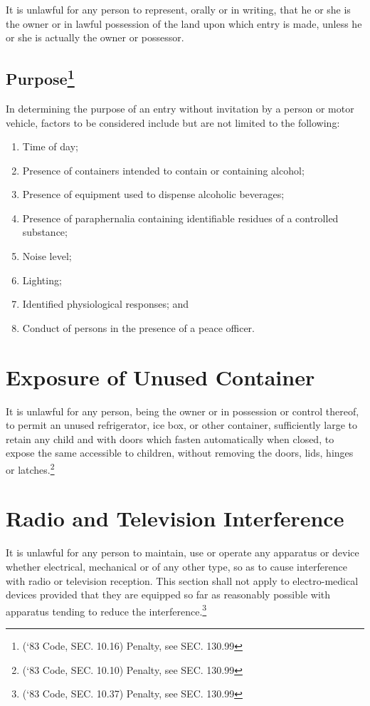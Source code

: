 \subsubsection{}
It is unlawful for any person to represent, orally or in writing, that he or she is the owner or in lawful possession of the land upon which entry is made, unless he or she is actually the owner or possessor.
\subsection{Purpose\footnote{(‘83 Code, SEC. 10.16)  Penalty, see SEC. 130.99}}
In determining the purpose of an entry without invitation by a person or motor vehicle, factors to be considered include but are not limited to the following:
\begin{enumerate}[{\indent}1)]
    \item Time of day; 
    \item Presence of containers intended to contain or containing alcohol; 
    \item Presence of equipment used to dispense alcoholic beverages; 
    \item Presence of paraphernalia containing identifiable residues of a controlled substance; 
    \item Noise level; 
    \item Lighting; 
    \item Identified physiological responses; and 
    \item Conduct of persons in the presence of a peace officer.
\end{enumerate}

\section{Exposure of Unused Container}
It is unlawful for any person, being the owner or in possession or control thereof, to permit an unused refrigerator, ice box, or other container, sufficiently large to retain any child and with doors which fasten automatically when closed, to expose the same accessible to children, without removing the doors, lids, hinges or latches.\footnote{(‘83 Code, SEC. 10.10)  Penalty, see SEC. 130.99}

\section{Radio and Television Interference}
It is unlawful for any person to maintain, use or operate any apparatus or device whether electrical, mechanical or of any other type, so as to cause interference with radio or television reception. This section shall not apply to electro-medical devices provided that they are equipped so far as reasonably possible with apparatus tending to reduce the interference.\footnote{(‘83 Code, SEC. 10.37)  Penalty, see SEC. 130.99}

